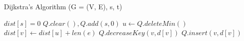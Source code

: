 \documentclass{article}
\begin{document}
\begin{algorithm}
\captionsetup{labelformat=empty, labelsep=none}
\caption{Dijkstra's Algorithm (G = (V, E), s, t)}
\begin{algorithmic}[2]
    \State $dist[s] = 0$
    \State $Q.clear(), Q.add(s,0)$
        \State $u \gets Q.deleteMin()$
                \State $dist[v] \gets dist[u] + len(e)$
                 \State $Q.decreaseKey(v, d[v])$
                \Else{} \State $Q.insert(v, d[v])$
                \EndIf
            \EndIf
        \EndFor
    \EndWhile
\end{algorithmic}
\end{algorithm}
\end{document}
